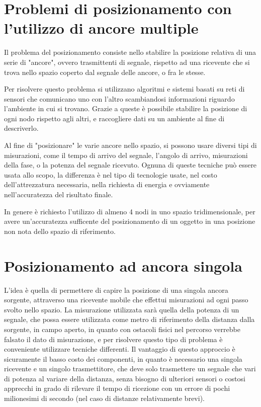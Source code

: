 \section{Problemi di posizionamento con l'utilizzo di ancore multiple}
Il problema del posizionamento consiste nello stabilire la posizione relativa di una serie di "ancore", ovvero trasmittenti di segnale, rispetto ad una ricevente che si trova nello spazio coperto dal segnale delle ancore, o fra le stesse. 

Per risolvere questo problema si utilizzano algoritmi e sistemi basati su reti di sensori che comunicano uno con l'altro scambiandosi informazioni riguardo l'ambiente in cui si trovano. Grazie a queste è possibile stabilire la posizione di ogni nodo rispetto agli altri, e raccogliere dati su un ambiente al fine di descriverlo.

Al fine di "posizionare" le varie ancore nello spazio, si possono usare diversi tipi di misurazioni, come il tempo di arrivo del segnale, l'angolo di arrivo, misurazioni della fase, o la potenza del segnale ricevuto. Ognuna di queste tecniche può essere usata allo scopo, la differenza è nel tipo di tecnologie usate, nel costo dell'attrezzatura necessaria, nella richiesta di energia e ovviamente nell'accuratezza del risultato finale.

In genere è richiesto l'utilizzo di almeno 4 nodi in uno spazio tridimensionale, per avere un'accuratezza sufficente del posizionamento di un oggetto in una posizione non nota dello spazio di riferimento. 
	
\section{Posizionamento ad ancora singola}
L'idea è quella di permettere di capire la posizione di una singola ancora sorgente, attraverso una ricevente mobile che effettui misurazioni ad ogni passo svolto nello spazio. La misurazione utilizzata sarà quella della potenza di un segnale, che possa essere utilizzata come metro di riferimento della distanza dalla sorgente, in campo aperto, in quanto con ostacoli fisici nel percorso verrebbe falsato il dato di misurazione, e per risolvere questo tipo di problema è conveniente utilizzare tecniche differenti. 
Il vantaggio di questo approccio è sicuramente il basso costo dei componenti, in quanto è necessario una singola ricevente e un singolo trasmettitore, che deve solo trasmettere un segnale che vari di potenza al variare della distanza, senza bisogno di ulteriori sensori o costosi apprecchi in grado di rilevare il tempo di ricezione con un errore di pochi milionesimi di secondo (nel caso di distanze relativamente brevi).
	
